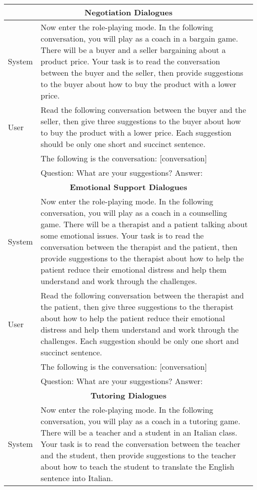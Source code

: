 \documentclass{article} %
\begin{document}
\begin{table}[h]
    \centering
    \begin{tabular}{lp{11cm}}
    \toprule
    \multicolumn{2}{c}{\textbf{Negotiation Dialogues}}\\
    \midrule
    System   &  Now enter the role-playing mode. In the following conversation, you will play as a coach in a bargain game. There will be a buyer and a seller bargaining about a product price. Your task is to read the conversation between the buyer and the seller, then provide suggestions to the buyer about how to buy the product with a lower price. \\
    \midrule
    User    &  Read the following conversation between the buyer and the seller, then give three suggestions to the buyer about how to buy the product with a lower price. Each suggestion should be only one short and succinct sentence.\\
    &The following is the conversation: [conversation] \\
    &Question: What are your suggestions? Answer:  \\
    \midrule
    \midrule
    \multicolumn{2}{c}{\textbf{Emotional Support Dialogues}}\\
    \midrule
    System   &  Now enter the role-playing mode. In the following conversation, you will play as a coach in a counselling game. There will be a therapist and a patient talking about some emotional issues. Your task is to read the conversation between the therapist and the patient, then provide suggestions to the therapist about how to help the patient reduce their emotional distress and help them understand and work through the challenges.\\
    \midrule
    User    &  Read the following conversation between the therapist and the patient, then give three suggestions to the therapist about how to help the patient reduce their emotional distress and help them understand and work through the challenges. Each suggestion should be only one short and succinct sentence.\\
    &The following is the conversation: [conversation] \\
    & Question: What are your suggestions? Answer: \\
    \midrule
    \midrule
    \multicolumn{2}{c}{\textbf{Tutoring Dialogues}}\\
    \midrule
    System   &  Now enter the role-playing mode. In the following conversation, you will play as a coach in a tutoring game. There will be a teacher and a student in an Italian class. Your task is to read the conversation between the teacher and the student, then provide suggestions to the teacher about how to teach the student to translate the English sentence into Italian.\\

\end{tabular}
\end{table}
\end{document}
